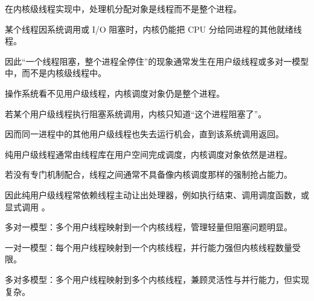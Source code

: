 \begin{points}
  \item 在内核级线程实现中，处理机分配对象是线程而不是整个进程。
  \item 某个线程因系统调用或 I/O 阻塞时，内核仍能把 CPU 分给同进程的其他就绪线程。
  \item 因此“一个线程阻塞，整个进程全停住”的现象通常发生在用户级线程或多对一模型中，而不是内核级线程中。
\end{points}


\begin{points}
  \item 操作系统看不见用户级线程，内核调度对象仍是整个进程。
  \item 若某个用户级线程执行阻塞系统调用，内核只知道“这个进程阻塞了”。
  \item 因而同一进程中的其他用户级线程也失去运行机会，直到该系统调用返回。
\end{points}


\begin{points}
  \item 纯用户级线程通常由线程库在用户空间完成调度，内核调度对象依然是进程。
  \item 若没有专门机制配合，线程之间通常不具备像内核调度那样的强制抢占能力。
  \item 因此纯用户级线程常依赖线程主动让出处理器，例如执行结束、调用调度函数，或显式调用 。
\end{points}


\begin{points}
  \item 多对一模型：多个用户线程映射到一个内核线程，管理轻量但阻塞问题明显。
  \item 一对一模型：每个用户线程映射到一个内核线程，并行能力强但内核线程数量受限。
  \item 多对多模型：多个用户线程映射到多个内核线程，兼顾灵活性与并行能力，但实现复杂。
\end{points}


